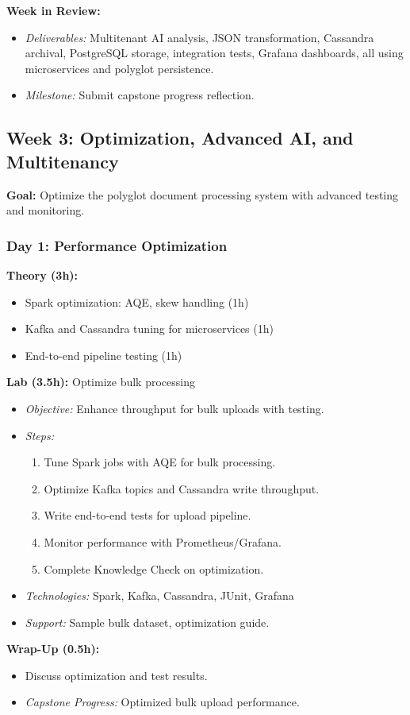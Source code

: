 \documentclass[11pt]{article}
\begin{document}
\textbf{Week in Review:}
\begin{itemize}
    \item \textit{Deliverables:} Multitenant AI analysis, JSON transformation, Cassandra archival, PostgreSQL storage, integration tests, Grafana dashboards, all using microservices and polyglot persistence.
    \item \textit{Milestone:} Submit capstone progress reflection.
\end{itemize}

\subsection{Week 3: Optimization, Advanced AI, and Multitenancy}
\textbf{Goal:} Optimize the polyglot document processing system with advanced testing and monitoring.

\subsubsection{Day 1: Performance Optimization}
\textbf{Theory (3h):}
\begin{itemize}
    \item Spark optimization: AQE, skew handling (1h)
    \item Kafka and Cassandra tuning for microservices (1h)
    \item End-to-end pipeline testing (1h)
\end{itemize}
\textbf{Lab (3.5h):} Optimize bulk processing
\begin{itemize}
    \item \textit{Objective:} Enhance throughput for bulk uploads with testing.
    \item \textit{Steps:}
        \begin{enumerate}
            \item Tune Spark jobs with AQE for bulk processing.
            \item Optimize Kafka topics and Cassandra write throughput.
            \item Write end-to-end tests for upload pipeline.
            \item Monitor performance with Prometheus/Grafana.
            \item Complete Knowledge Check on optimization.
        \end{enumerate}
    \item \textit{Technologies:} Spark, Kafka, Cassandra, JUnit, Grafana
    \item \textit{Support:} Sample bulk dataset, optimization guide.
\end{itemize}
\textbf{Wrap-Up (0.5h):}
\begin{itemize}
    \item Discuss optimization and test results.
    \item \textit{Capstone Progress:} Optimized bulk upload performance.
\end{itemize}
\end{document}
